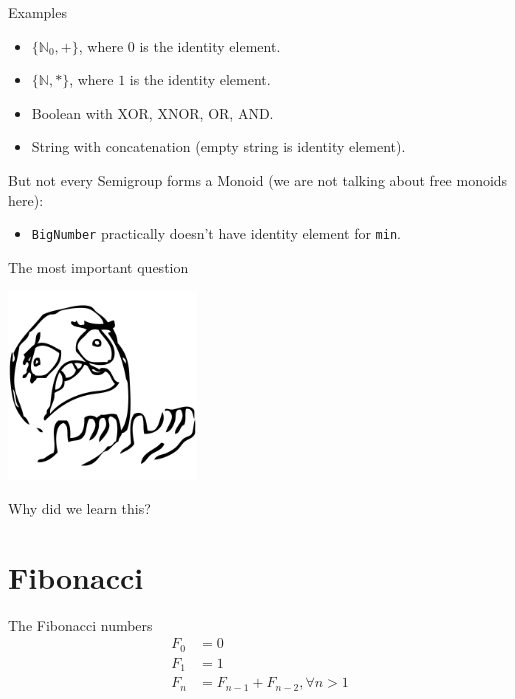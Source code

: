\documentclass[presentation,aspectratio=169,smaller]{beamer}
\begin{document}
\begin{frame}[label={sec:org72a0c94},fragile]{Examples}
 \begin{itemize}
\item \(\{\mathbb{N}_0, +\}\), where \(0\) is the identity element.
\item \(\{\mathbb{N}, *\}\), where \(1\) is the identity element.
\item Boolean with XOR, XNOR, OR, AND.
\item String with concatenation (empty string is identity element).
\end{itemize}

\pause

But not every Semigroup forms a Monoid (we are not talking about free monoids
here):

\begin{itemize}
\item \texttt{BigNumber} practically doesn’t have identity element for \texttt{min}.
\end{itemize}
\end{frame}

\begin{frame}[label={sec:org5e745bf}]{The most important question}
\pause

\begin{center}
\includegraphics[height=5cm]{images/whyyy.png}
\end{center}

Why did we learn this?
\end{frame}

\section{Fibonacci}
\label{sec:org1e1f90e}

\begin{frame}[label={sec:org310eab1}]{The Fibonacci numbers}
\begin{align*}
  F_0 &= 0 \\
  F_1 &= 1 \\
  F_n &= F_{n - 1} + F_{n - 2}, \forall n > 1 \\
\end{align*}
\end{frame}
\end{document}
